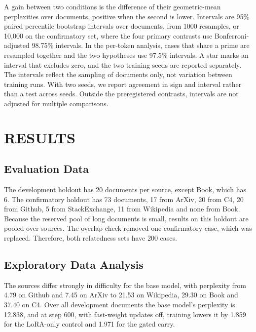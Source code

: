 \documentclass[12pt,a4paper]{report}
\begin{document}
A gain between two conditions is the difference of their geometric-mean perplexities over documents, positive when the second is lower. Intervals are 95\% paired percentile bootstrap intervals \citep{efron1993bootstrap} over documents, from 1000 resamples, or 10{,}000 on the confirmatory set, where the four primary contrasts use Bonferroni-adjusted \citep{dunn1961multiple} 98.75\% intervals. In the per-token analysis, cases that share a prime are resampled together and the two hypotheses use 97.5\% intervals. A star marks an interval that excludes zero, and the two training seeds are reported separately. The intervals reflect the sampling of documents only, not variation between training runs. With two seeds, we report agreement in sign and interval rather than a test across seeds. Outside the preregistered contrasts, intervals are not adjusted for multiple comparisons.

\chapter{RESULTS}

\section{Evaluation Data}
\label{sec-evaldata}

The development holdout has 20 documents per source, except Book, which has 6. The confirmatory holdout has 73 documents, 17 from ArXiv, 20 from C4, 20 from Github, 5 from StackExchange, 11 from Wikipedia and none from Book. Because the reserved pool of long documents is small, results on this holdout are pooled over sources. The overlap check removed one confirmatory case, which was replaced. Therefore, both relatedness sets have 200 cases.

\section{Exploratory Data Analysis}

The sources differ strongly in difficulty for the base model, with perplexity from 4.79 on Github and 7.45 on ArXiv to 21.53 on Wikipedia, 29.30 on Book and 37.40 on C4. Over all development documents the base model's perplexity is 12.838, and at step 600, with fast-weight updates off, training lowers it by 1.859 for the LoRA-only control and 1.971 for the gated carry.
\end{document}
